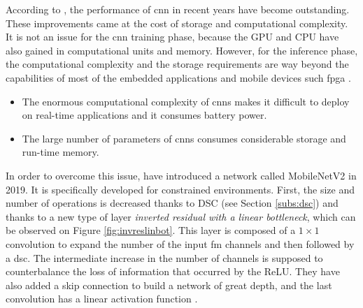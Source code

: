 According to \textcite{cheng_recent_2018}, the performance of \acrshort{cnn} in recent years have become outstanding. These improvements came at the cost of storage and computational complexity. It is not an issue for the \acrshort{cnn} training phase, because the GPU and CPU have also gained in computational units and memory. However, for the inference phase, the computational complexity and the storage requirements are way beyond the capabilities of most of the embedded applications and mobile devices such \acrshort{fpga} \cite{cheng_recent_2018}.
%
\begin{itemize}
    \item The enormous computational complexity of \acrshort{cnn}s makes it difficult to deploy on real-time applications and it consumes battery power.
    \item The large number of parameters of \acrshort{cnn}s consumes considerable storage and run-time memory.
\end{itemize}

In order to overcome this issue, \textcite{sandler_mobilenetv2_2019} have introduced a network called MobileNetV2 in 2019. It is specifically developed for constrained environments. First, the size and number of operations is decreased thanks to DSC (see Section \ref{subs:dsc}) and thanks to a new type of layer \textit{inverted residual with a linear bottleneck}, which can be observed on Figure \ref{fig:invreslinbot}. This layer is composed of a $1 \times 1$ convolution to expand the number of the input \acrshort{fm} channels and then followed by a \acrshort{dsc}. The intermediate increase in the number of channels is supposed to counterbalance the loss of information that occurred by the ReLU. They have also added a skip connection to build a network of great depth, and the last convolution has a linear activation function \cite{sandler_mobilenetv2_2019}.
